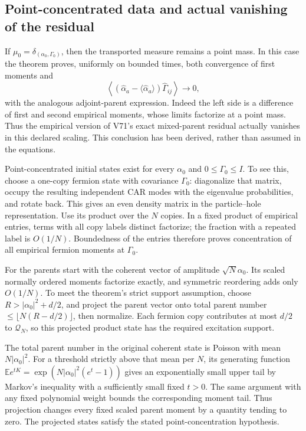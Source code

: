 \documentclass[11pt]{article}
\theoremstyle{remark}
\begin{document}
\subsection{Point-concentrated data and actual vanishing of the residual}

If \(\mu_0=\delta_{(\alpha_0,\Gamma_0)}\), then the
transported measure remains a point mass.  In this
case the theorem proves, uniformly on bounded times,
both convergence of first moments and
\[
 \left\langle
 (\widehat\alpha_a-\langle\widehat\alpha_a\rangle)
                  \widehat\Gamma_{ij}\right\rangle\longrightarrow0,
\]
with the analogous adjoint-parent expression.
Indeed the left side is a difference of first and
second empirical moments, whose limits factorize
at a point mass.  Thus the empirical version of
V71's exact mixed-parent residual actually vanishes
in this declared scaling.  This conclusion has
been derived, rather than assumed in the equations.

Point-concentrated initial states exist for every
\(\alpha_0\) and \(0\leq\Gamma_0\leq I\).
To see this, choose a one-copy fermion state with
covariance \(\Gamma_0\): diagonalize that matrix,
occupy the resulting independent CAR modes with
the eigenvalue probabilities, and rotate back.
This gives an even density matrix in the
particle--hole representation.  Use its product
over the \(N\) copies.  In a fixed product of
empirical entries, terms with all copy labels
distinct factorize; the fraction with a repeated
label is \(O(1/N)\).  Boundedness of the entries
therefore proves concentration of all empirical
fermion moments at \(\Gamma_0\).

For the parents start with the coherent vector of
amplitude \(\sqrt N\alpha_0\).  Its scaled normally
ordered moments factorize exactly, and symmetric
reordering adds only \(O(1/N)\).
To meet the theorem's strict support assumption,
choose \(R>|\alpha_0|^2+d/2\), and project the parent
vector onto total parent number
\(\leq\lfloor N(R-d/2)\rfloor\), then normalize.
Each fermion copy contributes at most \(d/2\)
to \(\mathcal Q_N\), so this projected product
state has the required excitation support.

The total parent number in the original coherent
state is Poisson with mean \(N|\alpha_0|^2\).
For a threshold strictly above that mean per \(N\),
its generating function
\(\mathbb E e^{tK}=\exp(N|\alpha_0|^2(e^t-1))\)
gives an exponentially small upper tail by
Markov's inequality with a sufficiently small
fixed \(t>0\).  The same argument with any fixed
polynomial weight bounds the corresponding moment
tail.  Thus projection changes every fixed
scaled parent moment by a quantity tending to
zero.  The projected states satisfy the stated
point-concentration hypothesis.
\end{document}
